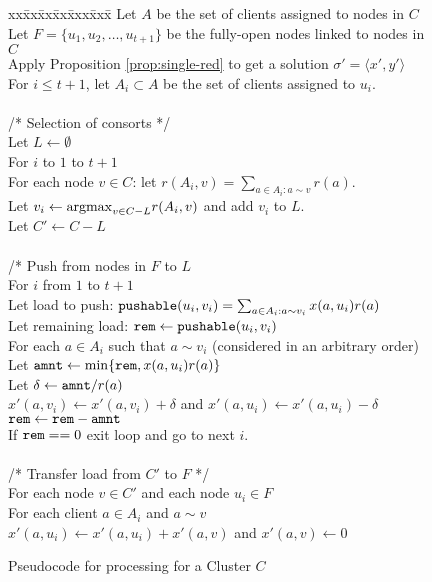 \documentclass[11pt]{article}
\newcommand{\push} {{\tt pushable}}
\newcommand{\argmax} {{\rm argmax}}
\newcommand{\pair}[2] {\langle #1, #2\rangle}
\newcommand{\amnt} {{\tt amnt}}
\newcommand{\rem} {{\tt rem}}
\begin{document}
\begin{figure}
\begin{center}
\begin{boxedminipage}{0.8\hsize}
\begin{tabbing}
xx\=xx\=xx\=xx\=xxx\=xxx\=\kill
Let $A$ be the set of clients assigned to nodes in $C$\\
Let $F=\{u_1, u_2, \ldots, u_{t+1}\}$ be the fully-open nodes linked to nodes in $C$\\
Apply Proposition \ref{prop:single-red} to get a solution $\sigma' =\pair{x'}{y'}$\\
For $i\leq t+1$, let $A_i\subset A$ be the set of clients assigned to $u_i$.\\
\\
/* Selection of consorts */\\
Let $L \leftarrow \emptyset$\\
For $i$ to $1$ to $t+1$\\
\> For each node $v\in C$: let $r(A_i, v) = \sum_{a\in A_i:a\sim v} r(a)$.\\
\> Let $v_i \leftarrow \argmax_{v\in C-L} r(A_i, v)$ and add $v_i$ to $L$.\\
Let $C' \leftarrow C-L$\\
\\
/* Push from nodes in $F$ to $L$\\
For $i$ from $1$ to $t+1$\\
\> Let load to push: $\push(u_i, v_i) = \sum_{a\in A_i:a\sim v_i} x(a, u_i)r(a)$\\
\> Let remaining load: $\rem \leftarrow \push(u_i, v_i)$\\
\> For each $a\in A_i$ such that $a \sim v_i$ (considered in an arbitrary order)\\
\> \> Let $\amnt \leftarrow \min\{\rem, x(a, u_i)r(a)\}$\\
\> \> Let $\delta \leftarrow \amnt/r(a)$\\
\> \> $x'(a, v_i) \leftarrow x'(a, v_i) + \delta$ and $x'(a, u_i) \leftarrow x'(a, u_i) - \delta$\\
\> \> $\rem \leftarrow \rem - \amnt$\\
\> \> If $\rem == 0$ exit loop and go to next $i$.\\
\\
/* Transfer load from $C'$ to $F$ */\\
For each node $v\in C'$ and each node $u_i\in F$\\
\> For each client $a\in A_i$ and $a\sim v$\\
\> \> $x'(a, u_i) \leftarrow x'(a, u_i) + x'(a, v)$ and $x'(a, v) \leftarrow 0$\\
\end{tabbing}
\end{boxedminipage}
\end{center}
\caption{Pseudocode for processing for a Cluster $C$}
\label{fig:C}
\end{figure}
\end{document}
